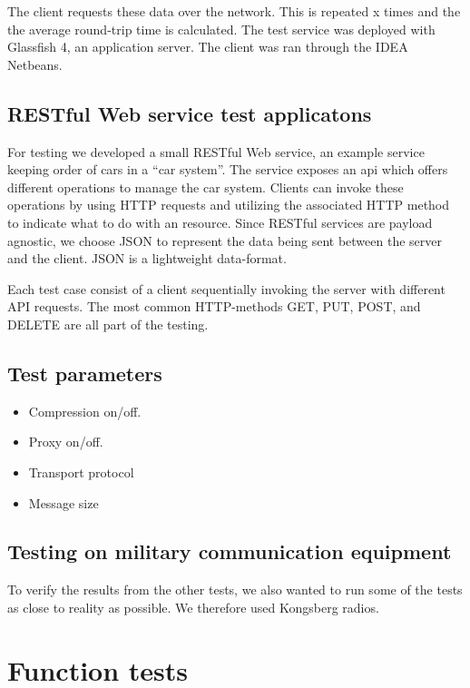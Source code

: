 The client requests these data over the network. This is repeated x times and
the the average round-trip time is calculated. The test service was deployed
with Glassfish 4, an application server. The client was ran through the IDEA
Netbeans.


\subsection{RESTful Web service test applicatons}

For testing we developed a small RESTful Web service, an example service
keeping order of cars in a ``car system''. The service exposes an \gls{api}
which offers different operations to manage the car system. Clients can invoke
these operations by using HTTP requests and utilizing the associated HTTP
method to indicate what to do with an resource. Since RESTful services are
payload agnostic, we choose JSON to represent the data being sent between the
server and the client. JSON is a lightweight data-format.

Each test case consist of a client sequentially invoking the server with
different API requests. The most common HTTP-methods GET, PUT, POST, and
DELETE are all part of the testing.



\subsection{Test parameters}

\begin{itemize}
	\item Compression on/off.
	\item Proxy on/off.
    \item Transport protocol
    \item Message size
\end{itemize}

\subsection{Testing on military communication equipment}

To verify the results from the other tests, we also wanted to run some of the
tests as close to reality as possible. We therefore used Kongsberg radios.

\section{Function tests}

